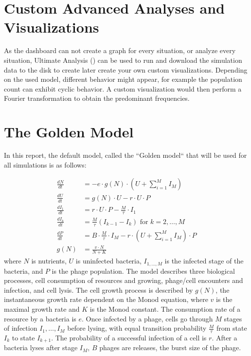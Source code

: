 \section{Custom Advanced Analyses and Visualizations}
As the dashboard can not create a graph for every situation, or analyze every situation, Ultimate Analysis () can be used to run and download the simulation data to the disk to create later create your own custom visualizations. 
Depending on the used model, different behavior might appear, for example the population count can exhibit cyclic behavior. 
A custom visualization would then perform a Fourier transformation to obtain the predominant frequencies. 

\section{The Golden Model}
In this report, the default model, called the “Golden model“ \cite{gengUsingBacterialPopulation2024} that will be used for all simulations is as follows:

\begin{align}
    \frac{dN}{dt} &= -e \cdot g(N)\cdot (U + \sum_{i=1}^{M} I_M)\\
    \frac{dU}{dt} &= g(N)\cdot U - r\cdot U \cdot P\\
    \frac{dI_1}{dt} &= r\cdot U \cdot P - \frac{M}{\tau}\cdot I_1 \\
    \frac{dI_k}{dt} &= \frac{M}{\tau}(I_{k-1}-I_k) \text{ for } k=2, \dots, M \\
    \frac{dP}{dt} &= B\cdot\frac{M}{\tau} \cdot I_M - r\cdot(U + \sum_{i=1}^{M} I_M)\cdot P \\
    g(N) &= \frac{v\cdot N}{N + K}
\end{align}where $N$ is nutrients, $U$ is uninfected bacteria, $I_{1, \dots, M}$ is the infected stage of the bacteria, and $P$ is the phage population. \newline
The model describes three biological processes, cell consumption of resources and growing, phage/cell encounters and infection, and cell lysis. 
The cell growth process is described by $g(N)$, the instantaneous growth rate dependent on the Monod equation, where $v$ is the maximal growth rate and $K$ is the Monod constant. 
The consumption rate of a resource by a bacteria is $e$. \newline
Once infected by a phage, cells go through $M$ stages of infection $I_1, \dots, I_M$ before lysing, with equal transition probability $\frac{M}{\tau}$ from state $I_k$ to state $I_{k+1}$. The probability of a successful infection of a cell is $r$. \newline
After a bacteria lyses after stage $I_M$, $B$ phages are releases, the burst size of the phage. \newline 

